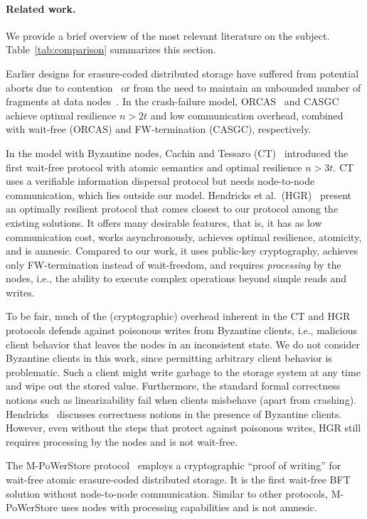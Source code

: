 \documentclass[oribibl]{llncs}
\theoremstyle{definition-boldhead}
\newcommand{\node}{node\xspace}
\newcommand{\nodes}{nodes\xspace}
\begin{document}
\paragraph{Related work.}

We provide a brief overview of the most relevant literature on the
subject.  Table~\ref{tab:comparison} summarizes this section.

Earlier designs for erasure-coded distributed storage have suffered
from potential aborts due to contention~\cite{fmssv04} or from
the need to maintain an unbounded number of fragments at data
\nodes~\cite{gwgr04}.
In the crash-failure model, ORCAS~\cite{dugule08} and
CASGC~\cite{clmm13} achieve optimal resilience $n > 2t$ and low
communication overhead, combined with wait-free (ORCAS)
and FW-termination (CASGC), respectively.

In the model with Byzantine \nodes, Cachin and Tessaro
(CT)~\cite{cactes06} introduced the first wait-free protocol with
atomic semantics and optimal resilience $n > 3t$.  CT uses a
verifiable information dispersal protocol but needs \node-to-\node
communication, which lies outside our model. Hendricks et al.~(HGR)~\cite{hegare07b} present an optimally resilient
protocol that comes closest to our protocol among the existing
solutions.  It offers many desirable features, that is, it has as
low communication cost, works asynchronously, achieves optimal
resilience, atomicity, and is amnesic.  Compared to our work, it uses
public-key cryptography, achieves only FW-termination instead of
wait-freedom, and requires \emph{processing} by the \nodes, i.e., the
ability to execute complex operations beyond simple reads and writes.

To be fair, much of the (cryptographic) overhead inherent in the CT
and HGR protocols defends against poisonous writes from Byzantine
clients, i.e., malicious client behavior that leaves the \nodes in
an inconsistent state.  We do not consider Byzantine clients in this
work, since permitting arbitrary client behavior is problematic.  Such
a client might write garbage to the storage system at any time and
wipe out the stored value.
\if\submit\no
Furthermore, the standard formal
correctness notions such as linearizability fail when clients
misbehave (apart from crashing).  Hendricks~\cite{hendri09} discusses
correctness notions in the presence of Byzantine clients.
\fi
However,
even without the steps that protect against poisonous writes, HGR still
requires processing by the \nodes and is not wait-free.

The M-PoWerStore protocol~\cite{dklmsv13} employs a cryptographic
``proof of writing'' for wait-free atomic erasure-coded distributed
storage.  It is the first wait-free BFT solution without
\node-to-\node communication.  Similar to other protocols,
M-PoWerStore uses \nodes with processing capabilities and is not
amnesic.
\end{document}
